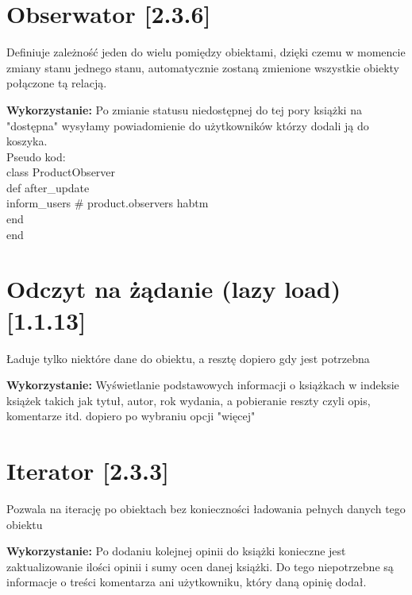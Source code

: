 \documentclass[pdflatex,11pt]{aghdpl}
\begin{document}


\section{Obserwator [2.3.6]}

Definiuje zależność jeden do wielu pomiędzy obiektami, dzięki czemu w momencie zmiany stanu jednego stanu, automatycznie zostaną zmienione wszystkie obiekty połączone tą relacją.

\textbf{Wykorzystanie:} Po zmianie statusu niedostępnej do tej pory książki na "dostępna" wysyłamy powiadomienie do użytkowników którzy dodali ją do koszyka.\\
    Pseudo kod:\\
    class ProductObserver\\
       def after\_update\\
          inform\_users \# product.observers habtm\\
       end\\
    end


\section{Odczyt na żądanie (lazy load) [1.1.13]}

Ładuje tylko niektóre dane do obiektu, a resztę dopiero gdy jest potrzebna

\textbf{Wykorzystanie:} Wyświetlanie podstawowych informacji o książkach w indeksie książek takich jak tytuł, autor, rok wydania, a pobieranie reszty czyli opis, komentarze itd. dopiero po wybraniu opcji "więcej"


\section{Iterator [2.3.3]}

Pozwala na iterację po obiektach bez konieczności ładowania pełnych danych tego obiektu

\textbf{Wykorzystanie:} Po dodaniu kolejnej opinii do książki konieczne jest zaktualizowanie ilości opinii i sumy ocen danej książki. Do tego niepotrzebne są informacje o treści komentarza ani użytkowniku, który daną opinię dodał.

\end{document}
